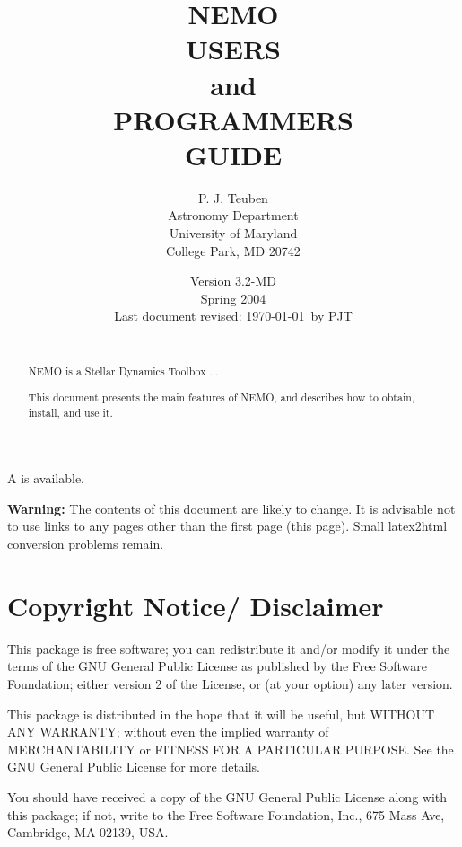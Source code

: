 \documentclass[headsepline,normalheadings]{book}
\title{ {\Huge NEMO} \\
           {\LARGE USERS \\ 
                   and \\
               PROGRAMMERS \\ 
                  GUIDE}}
\author{
 {P. J. Teuben} \\
 {Astronomy Department} \\
 {University of Maryland} \\
 {College Park, MD 20742}
       }
\date{{\small Version 3.2-MD} \\
      {\small Spring 2004} \\
      {\small Last document revised: \today\ by PJT} \\ \\
     }
\begin{document}

\setlength{\parindent}{0pt}
\setlength{\parskip}{2.5mm}

\maketitle
\begin{htmlonly}
A 
is available. 

{\bf Warning:} The contents of this document are likely to change.
It is advisable not to use links to any pages other than the first
page (this page). Small latex2html conversion problems remain.
\end{htmlonly}

\begin{abstract} 
NEMO is a Stellar Dynamics Toolbox ...

This document presents the main features of NEMO, and
describes how to obtain, install, and use it.
\end{abstract}


\pagestyle{empty}
\newpage

\small
\section*{Copyright Notice/ Disclaimer}

This package is free software; you can redistribute it and/or modify
it under the terms of the GNU General Public License as published by
the Free Software Foundation; either version 2 of the License, or
(at your option) any later version.

This package is distributed in the hope that it will be useful,
but WITHOUT ANY WARRANTY; without even the implied warranty of
MERCHANTABILITY or FITNESS FOR A PARTICULAR PURPOSE.  See the
GNU General Public License for more details.

You should have received a copy of the GNU General Public License
along with this package; if not, write to the Free Software
Foundation, Inc., 675 Mass Ave, Cambridge, MA 02139, USA.
\end{document}
